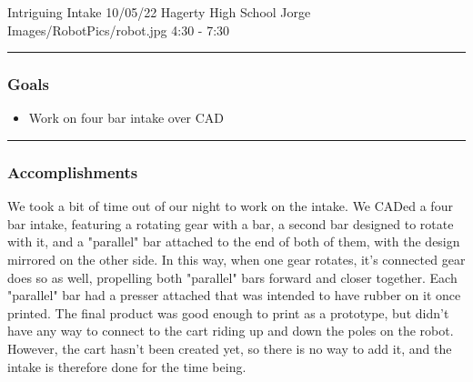 \insertmeeting 
	{Intriguing Intake} 
	{10/05/22}
	{Hagerty High School}
	{Jorge}
	{Images/RobotPics/robot.jpg}
	{4:30 - 7:30}
	
\noindent\hfil\rule{\textwidth}{.4pt}\hfil
\subsubsection*{Goals}
\begin{itemize}
    \item Work on four bar intake over CAD

\end{itemize} 

\noindent\hfil\rule{\textwidth}{.4pt}\hfil

\subsubsection*{Accomplishments}
We took a bit of time out of our night to work on the intake. We CADed a four bar intake, featuring a rotating gear with a bar, a second bar designed to rotate with it, and a "parallel" bar attached to the end of both of them, with the design mirrored on the other side. In this way, when one gear rotates, it's connected gear does so as well, propelling both "parallel" bars forward and closer together. Each "parallel" bar had a presser attached that was intended to have rubber on it once printed. The final product was good enough to print as a prototype, but didn't have any way to connect to the cart riding up and down the poles on the robot. However, the cart hasn't been created yet, so there is no way to add it, and the intake is therefore done for the time being.




